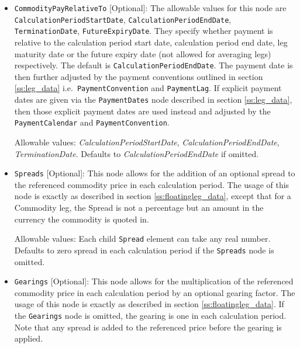 \begin{itemize}
\item
\lstinline!CommodityPayRelativeTo! [Optional]: The allowable values for this node are \\
\lstinline!CalculationPeriodStartDate!, \lstinline!CalculationPeriodEndDate!, \lstinline!TerminationDate!, \lstinline!FutureExpiryDate!. They specify whether payment is relative to the calculation period start date, calculation period end date, leg maturity date or the future expiry date (not allowed for averaging legs) respectively. The default is \lstinline!CalculationPeriodEndDate!. The payment date is then further adjusted by the payment conventions outlined in section \ref{ss:leg_data} i.e.\ \lstinline!PaymentConvention! and \lstinline!PaymentLag!. If explicit payment dates are given via the \lstinline!PaymentDates! node described in section \ref{ss:leg_data}, then those explicit payment dates are used instead and adjusted by the \lstinline!PaymentCalendar! and \lstinline!PaymentConvention!.

Allowable values: \emph{CalculationPeriodStartDate}, \emph{CalculationPeriodEndDate}, \emph{TerminationDate}. Defaults to  \emph{CalculationPeriodEndDate} if omitted.

\item
\lstinline!Spreads! [Optional]: This node allows for the addition of an optional spread to the referenced commodity price in each calculation period. The usage of this node is exactly as described in section \ref{ss:floatingleg_data}, except that for a Commodity leg, the Spread is not a percentage but an amount in the currency the commodity is quoted in. 

Allowable values: Each child \lstinline!Spread! element can take any real number. Defaults to zero spread in each calculation period if the \lstinline!Spreads! node is omitted.

\item
\lstinline!Gearings! [Optional]: This node allows for the multiplication of the referenced commodity price in each calculation period by an optional gearing factor. The usage of this node is exactly as described in section \ref{ss:floatingleg_data}. If the \lstinline!Gearings! node is omitted, the gearing is one in each calculation period. Note that any spread is added to the referenced price before the gearing is applied.


\end{itemize}
